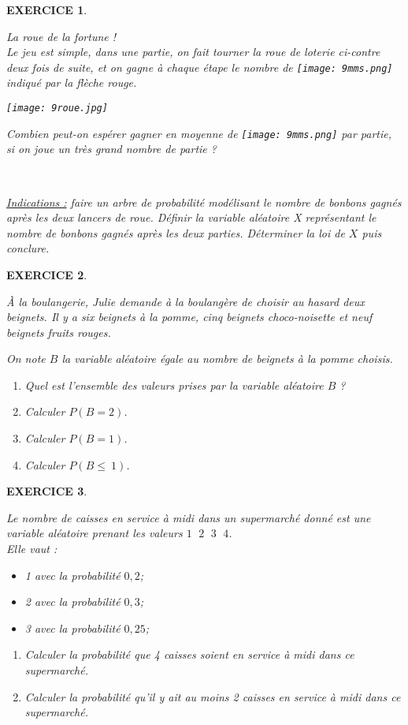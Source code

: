 \documentclass[a4paper]{article}   %
\renewcommand{\(}{\left(}
\renewcommand{\)}{\right)}
\newtheorem{EXO}{\large EXERCICE }
\newenvironment{EX}   { \setcounter{ques}{0} \begin{EXO} \hrulefill ~\vspace{0.3cm}

\normalfont}    {\end{EXO} \medskip}
\newcommand{\ie}{\leqslant ~}  		%
\begin{document}
\begin{EX}
La roue de la fortune ! \\
Le jeu est simple, dans une partie, on fait tourner la roue de loterie ci-contre deux fois de suite, et on gagne à chaque étape le nombre de \texttt{[image: 9mms.png]} indiqué par la flèche rouge. \\
\begin{center}
\texttt{[image: 9roue.jpg]}
\end{center}

Combien peut-on espérer gagner en moyenne de \texttt{[image: 9mms.png]} par partie, si on joue un très grand nombre de partie ?

~\hrulefill~

{\small{ {\underline{Indications :}} faire un arbre de probabilité modélisant le nombre de bonbons gagnés après les deux lancers de roue. Définir la variable aléatoire X représentant le nombre de bonbons gagnés après les deux parties. Déterminer la loi de $X$ puis conclure.}}
\end{EX}
\begin{EX}
\`A la boulangerie, Julie demande à la boulangère de choisir au hasard deux beignets. Il y a six beignets à la pomme, cinq beignets choco-noisette et neuf beignets fruits rouges. 

On note $B$ la variable aléatoire égale au nombre de beignets à la pomme choisis. 
\begin{enumerate}
\item Quel est l'ensemble des valeurs prises par la variable aléatoire $B$ ?
\item Calculer $P(B=2)$.
\item Calculer $P(B=1)$.
\item Calculer $P(B \ie 1)$.
\end{enumerate}

\end{EX}

\begin{EX}
Le nombre de caisses en service à midi dans un supermarché donné est une variable aléatoire prenant les valeurs $1\,\;\,2\,\;\,3\,\;\,4$. \\ 
Elle vaut : \begin{itemize}
\item[•] 1 avec la probabilité $0,2$;
\item[•] 2 avec la probabilité $0,3$;
\item[•] 3 avec la probabilité $0,25$;
\end{itemize}
\begin{enumerate}
\item Calculer la probabilité que 4 caisses soient en service à midi dans ce supermarché. 
\item Calculer la probabilité qu'il y ait au moins 2 caisses en service à midi dans ce supermarché.  
\end{enumerate}
\end{EX}
\end{document}
